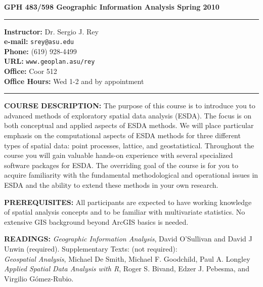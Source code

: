 \documentclass{article} %
\begin{document}
{\large \bf GPH 483/598 Geographic Information Analysis \hfill Spring 2010}
\vspace{.2in} %
\hrule 
\vspace{.1in} %
\textbf{Instructor:} Dr. Sergio J. Rey\\
\textbf{e-mail:} \texttt{srey@asu.edu}\\
\textbf{Phone:} (619) 928-4499\\
\textbf{URL:} \texttt{www.geoplan.asu/rey}\\
\textbf{Office:} Coor 512\\
\textbf{Office Hours:} Wed 1-2 and by appointment
\vspace{.1in} %
\hrule 
\vspace{.2in}
{\bf COURSE DESCRIPTION:} The purpose of this course is to introduce you to
advanced methods of exploratory spatial data analysis (ESDA).  The focus is on
both conceptual and applied aspects of ESDA methods. We will place particular
emphasis on the computational aspects of ESDA methods for three different
types of spatial data: point processes, lattice, and geostatistical. Throughout
the course you will gain valuable hands-on experience with several specialized
software packages for ESDA.  The overriding goal of the course is for you to
acquire familiarity with the fundamental methodological and operational issues
in ESDA and the ability to extend these methods in your own research.

\vspace{.2in}

{\bf PREREQUISITES:}
All participants are expected to have  working knowledge of spatial analysis
concepts and to be familiar with multivariate statistics. No extensive GIS
background beyond ArcGIS basics is needed.


\vspace{.2in}

{\bf READINGS:} \emph{Geographic Information Analysis}, David O'Sullivan and
David J Unwin (required).
Supplementary Texts: (not required):\\
\emph{Geospatial Analysis}, Michael De
Smith, Michael F. Goodchild, Paul A. Longley\\
\emph{Applied Spatial Data Analysis with R}, Roger S. Bivand, Edzer J.
Pebesma, and Virgilio G\'omez-Rubio.
\end{document}
